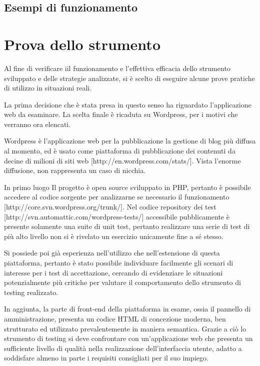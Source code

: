 \documentclass[12pt]{toptesi}
\begin{document}
\section{Esempi di funzionamento}

\chapter{Prova dello strumento}

Al fine di verificare iil funzionamento e l'effettiva efficacia dello strumento sviluppato e delle strategie analizzate, si è scelto di eseguire alcune prove pratiche di utilizzo in situazioni reali. 

La prima decisione che è stata presa in questo senso ha riguardato l'applicazione web da esaminare. La scelta finale è ricaduta su Wordpress, per i motivi che verranno ora elencati.

Wordpress è l'applicazione web per la pubblicazione la gestione di blog più diffusa al momento, ed è usato come piattaforma di pubblicazione dei contenuti da decine di milioni di siti web [http://en.wordpress.com/stats/]. Vista l'enorme diffusione, non rappresenta un caso di nicchia.

In primo luogo Il progetto è open source sviluppato in PHP, pertanto è possibile accedere al codice sorgente per analizzarne se necessario il funzionamento [http://core.svn.wordpress.org/trunk/]. Nel codice repository dei test [http://svn.automattic.com/wordpress-tests/] accessibile pubblicamente è presente solamente una suite di unit test, pertanto realizzare una serie di test di più alto livello non si è rivelato un esercizio unicamente fine a sé stesso.

Si possiede poi già esperienza nell'utilizzo che nell'estensione di questa piattaforma, pertanto è stato possibile individuare facilmente gli scenari di interesse per i test di accettazione, cercando di evidenziare le situazioni potenzialmente più critiche per valutare il comportamento dello strumento di testing realizzato. 

In aggiunta, la parte di front-end della piattaforma in esame, ossia il pannello di amministrazione, presenta un codice HTML di concezione moderna, ben strutturato ed utilizzato prevalentemente in maniera semantica. Grazie a ciò lo strumento di testing si deve confrontare con un'applicazione web che presenta un sufficiente livello di qualità nella realizzazione dell'interfaccia utente, adatto a soddisfare almeno in parte i requisiti consigliati per il suo impiego.
\end{document}
